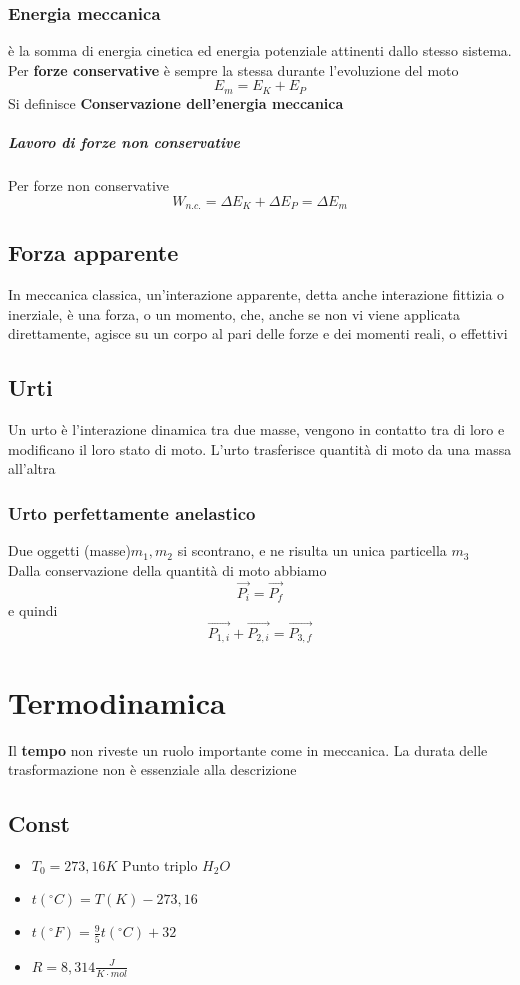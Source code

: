 \documentclass[a4paper]{report}
\begin{document}
  \subsection{Energia meccanica}
  è la somma di energia cinetica ed energia potenziale attinenti dallo stesso sistema.\\
  Per \textbf{forze conservative} è sempre la stessa durante l'evoluzione del moto
  \[ E_m = E_K + E_P \]
  Si definisce \textbf{Conservazione dell'energia meccanica}
  \paragraph{Lavoro di forze non conservative}
  Per forze non conservative
  \[ W_{n.c.} = \Delta E_K + \Delta E_P = \Delta E_m \]

  \section{Forza apparente}
  In meccanica classica, un'interazione apparente, detta anche interazione fittizia o inerziale, è una forza, o un momento, che, anche se non vi viene applicata direttamente, agisce su un corpo al pari delle forze e dei momenti reali, o effettivi

  \section{Urti}
  Un urto è l'interazione dinamica tra due masse, vengono in contatto tra di loro e modificano il loro stato di moto.
  L'urto trasferisce quantità di moto da una massa all'altra
  \subsection{Urto perfettamente anelastico}
  Due oggetti (masse)$m_1, m_2$ si scontrano, e ne risulta un unica particella $m_3$\\
  Dalla conservazione della quantità di moto abbiamo
  \[ \vec{P_i} = \vec{P_f} \]
  e quindi
  \[ \vec{P_{1,i}} + \vec{P_{2,i}} = \vec{P_{3,f}} \]




  \chapter{Termodinamica}
  Il \textbf{tempo} non riveste un ruolo importante come in meccanica. La durata delle trasformazione non è essenziale alla descrizione

  \section{Const}
  \begin{itemize}
    \item $T_0 = 273,16 K$ Punto triplo $H_2O$
    \item $t(^\circ C)= T(K) - 273,16$
    \item $t(^\circ F)= \frac{9}{5} t(^\circ C) + 32$
    \item $R = 8,314 \frac{J}{K \cdot mol}$
  \end{itemize}
\end{document}
